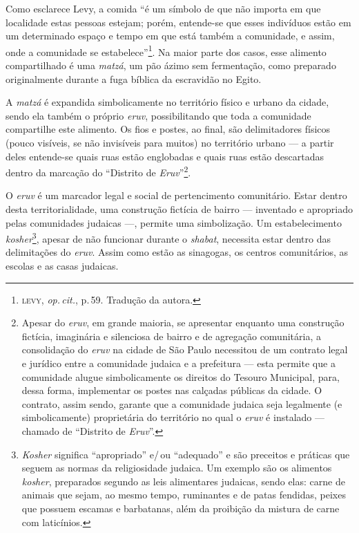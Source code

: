 Como esclarece Levy, a comida ``é um símbolo de que
não importa em que localidade estas pessoas estejam; porém, entende-se
que esses indivíduos estão em um determinado espaço e tempo em que está
também a comunidade, e assim, onde a comunidade se
estabelece''\footnote{\textsc{levy}, \emph{op.\,cit.}, p.\,59. Tradução da autora.}. Na
maior parte dos casos, esse alimento compartilhado é uma
\emph{matzá}, um pão ázimo sem fermentação, como preparado originalmente
durante a fuga bíblica da escravidão no Egito.

A \emph{matzá} é expandida simbolicamente no território físico e urbano da cidade, sendo ela também o próprio
\emph{eruv}, possibilitando que toda a comunidade compartilhe este
alimento. Os fios e postes, ao final, são delimitadores físicos (pouco
visíveis, se não invisíveis para muitos) no território urbano --- a
partir deles entende-se quais ruas estão englobadas e quais ruas estão
descartadas dentro da marcação do ``Distrito de
\emph{Eruv}''\footnote{Apesar do \emph{eruv}, em grande maioria, se
  apresentar enquanto uma construção fictícia, imaginária e silenciosa
  de bairro e de agregação comunitária, a consolidação do \emph{eruv} na
  cidade de São Paulo necessitou de um contrato legal e jurídico entre a
  comunidade judaica e a prefeitura --- esta permite que a comunidade
  alugue simbolicamente os direitos do Tesouro Municipal, para, dessa
  forma, implementar os postes nas calçadas públicas da cidade. O
  contrato, assim sendo, garante que a comunidade judaica seja
  legalmente (e simbolicamente) proprietária do território no qual o
  \emph{eruv} é instalado --- chamado de ``Distrito de \emph{Eruv}''.}.

O \emph{eruv} é um marcador legal e social de pertencimento comunitário.
Estar dentro desta territorialidade, uma construção fictícia de bairro
--- inventado e apropriado pelas comunidades judaicas ---, permite uma
simbolização. Um estabelecimento \emph{kosher}\footnote{\emph{Kosher}
  significa ``apropriado'' e/\,ou ``adequado'' e são preceitos e práticas
  que seguem as normas da religiosidade judaica. Um exemplo são os
  alimentos \emph{kosher}, preparados segundo as leis alimentares
  judaicas, sendo elas: carne de animais que sejam, ao mesmo tempo,
  ruminantes e de patas fendidas, peixes que possuem escamas e
  barbatanas, além da proibição da mistura de carne com laticínios.},
apesar de não funcionar durante o \emph{shabat}, necessita estar dentro
das delimitações do \emph{eruv}. Assim como estão as sinagogas, os
centros comunitários, as escolas e as casas judaicas.

